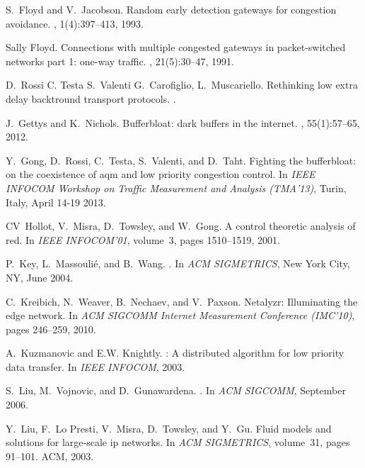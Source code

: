 \documentclass[conference]{IEEEtran}
\begin{document}
\begin{thebibliography}{10}
S.~Floyd and V.~Jacobson.
\newblock Random early detection gateways for congestion avoidance.
, 1(4):397--413, 1993.

Sally Floyd.
\newblock Connections with multiple congested gateways in packet-switched
  networks part 1: one-way traffic.
, 21(5):30--47, 1991.

D.~Rossi C. Testa S.~Valenti G.~Carofiglio, L.~Muscariello.
\newblock Rethinking low extra delay backtround transport protocols.
.

J.~Gettys and K.~Nichols.
\newblock Bufferbloat: dark buffers in the internet.
, 55(1):57--65, 2012.

Y.~Gong, D.~Rossi, C.~Testa, S.~Valenti, and D.~Taht.
\newblock Fighting the bufferbloat: on the coexistence of aqm and low priority
  congestion control.
\newblock In {\em IEEE INFOCOM Workshop on Traffic Measurement and Analysis
  (TMA'13)}, Turin, Italy, April 14-19 2013.

CV~Hollot, V.~Misra, D.~Towsley, and W.~Gong.
\newblock A control theoretic analysis of red.
\newblock In {\em IEEE INFOCOM'01}, volume~3, pages 1510--1519, 2001.

P.~Key, L.~Massouli{\'e}, and B.~Wang.
.
\newblock In {\em ACM SIGMETRICS}, New York City, NY, June 2004.

C.~Kreibich, N.~Weaver, B.~Nechaev, and V.~Paxson.
\newblock Netalyzr: Illuminating the edge network.
\newblock In {\em ACM SIGCOMM Internet Measurement Conference (IMC'10)}, pages
  246--259, 2010.

A.~Kuzmanovic and E.W. Knightly.
: A distributed algorithm for low priority data transfer.
\newblock In {\em IEEE INFOCOM}, 2003.

S.~Liu, M.~Vojnovic, and D.~Gunawardena.
.
\newblock In {\em ACM SIGCOMM}, September 2006.

Y.~Liu, F.~Lo Presti, V.~Misra, D.~Towsley, and Y.~Gu.
\newblock Fluid models and solutions for large-scale ip networks.
\newblock In {\em ACM SIGMETRICS}, volume~31, pages 91--101. ACM, 2003.


\end{thebibliography}
\end{document}
